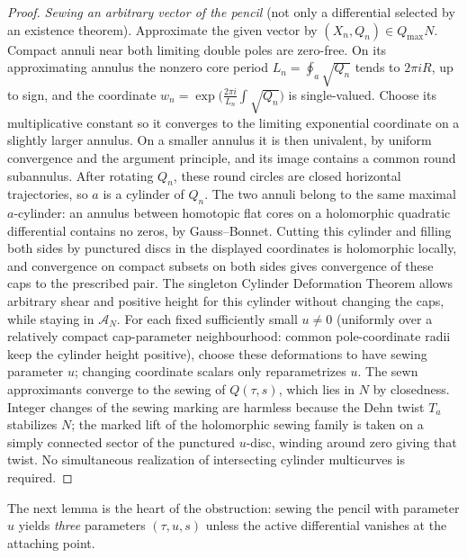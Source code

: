 \documentclass[12pt]{article}
\theoremstyle{remark}
\begin{document}
\begin{proof}
\emph{Sewing an arbitrary vector of the pencil} (not only a
differential selected by an existence theorem).
Approximate the given vector by \((X_n,Q_n)\in Q_{\max}N\). Compact annuli near
both limiting double poles are zero-free. On its approximating
annulus the nonzero core period \(L_n=\oint_a\sqrt{Q_n}\) tends
to \(2\pi iR\), up to sign, and the coordinate
\(w_n=\exp\bigl(\frac{2\pi i}{L_n}\int\sqrt{Q_n}\bigr)\)
is single-valued. Choose its multiplicative constant so it converges
to the limiting exponential coordinate on a slightly larger
annulus. On a smaller annulus it is then univalent, by
uniform convergence and the argument principle, and its
image contains a common round subannulus. After rotating
\(Q_n\), these round circles are closed horizontal
trajectories, so \(a\) is a cylinder of \(Q_n\).
The two annuli belong to the same maximal \(a\)-cylinder:
an annulus between homotopic flat cores on a holomorphic
quadratic differential contains no zeros, by Gauss--Bonnet.
Cutting this cylinder and filling both sides by punctured
discs in the displayed coordinates is holomorphic locally, and
convergence on compact subsets on both sides gives convergence
of these caps to the prescribed pair. The singleton
Cylinder Deformation Theorem \cite[Theorem 5.1]{WrightCylinder}
allows arbitrary shear and positive height for this cylinder
without changing the caps, while staying in \(\mathcal A_N\).
For each fixed sufficiently small \(u\ne0\) (uniformly over a
relatively compact cap-parameter neighbourhood: common
pole-coordinate radii keep the cylinder height positive), choose
these deformations to have sewing parameter \(u\); changing
coordinate scalars only reparametrizes \(u\). The sewn approximants
converge to the sewing of \(Q(\tau,s)\), which lies in \(N\) by
closedness. Integer changes of the sewing marking are harmless
because the Dehn twist \(T_a\) stabilizes \(N\); the marked lift of
the holomorphic sewing family is taken on a simply connected sector
of the punctured \(u\)-disc, winding around zero giving that twist.
No simultaneous realization of intersecting cylinder multicurves is
required.
\end{proof}

The next lemma is the heart of the obstruction: sewing the pencil
with parameter \(u\) yields \emph{three} parameters \((\tau,u,s)\)
unless the active differential vanishes at the attaching point.
\end{document}
